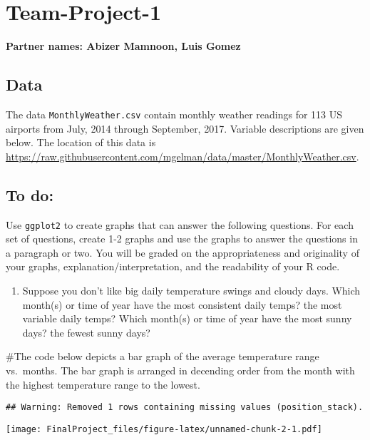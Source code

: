 \documentclass[
]{article}
\author{}
\date{\vspace{-2.5em}}
\providecommand{\tightlist}{%
  \setlength{\itemsep}{0pt}\setlength{\parskip}{0pt}}
\begin{document}
\hypertarget{team-project-1}{%
\section{Team-Project-1}\label{team-project-1}}

\textbf{Partner names: Abizer Mamnoon, Luis Gomez}

\hypertarget{data}{%
\subsection{Data}\label{data}}

The data \texttt{MonthlyWeather.csv} contain monthly weather readings
for 113 US airports from July, 2014 through September, 2017. Variable
descriptions are given below. The location of this data is
\url{https://raw.githubusercontent.com/mgelman/data/master/MonthlyWeather.csv}.

\hypertarget{to-do}{%
\subsection{To do:}\label{to-do}}

Use \texttt{ggplot2} to create graphs that can answer the following
questions. For each set of questions, create 1-2 graphs and use the
graphs to answer the questions in a paragraph or two. You will be graded
on the appropriateness and originality of your graphs,
explanation/interpretation, and the readability of your R code.

\begin{enumerate}
\def\labelenumi{\arabic{enumi}.}
\tightlist
\item
  Suppose you don't like big daily temperature swings and cloudy days.
  Which month(s) or time of year have the most consistent daily temps?
  the most variable daily temps? Which month(s) or time of year have the
  most sunny days? the fewest sunny days?
\end{enumerate}

\#The code below depicts a bar graph of the average temperature range
vs.~months. The bar graph is arranged in decending order from the month
with the highest temperature range to the lowest.

\begin{verbatim}
## Warning: Removed 1 rows containing missing values (position_stack).
\end{verbatim}

\texttt{[image: FinalProject\_files/figure-latex/unnamed-chunk-2-1.pdf]}
\end{document}
